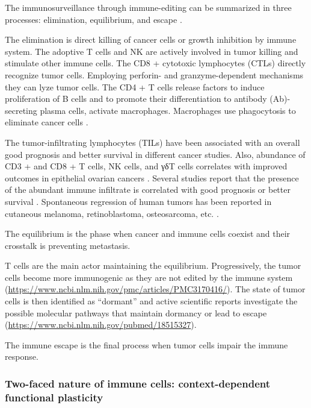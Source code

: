 \documentclass[12pt,]{book}
\theoremstyle{definition}
\theoremstyle{definition}
\theoremstyle{definition}
\theoremstyle{remark}
\begin{document}
The immunosurveillance through immune-editing can be summarized in three
processes: elimination, equilibrium, and escape \citep{Dunn2002}.

The elimination is direct killing of cancer cells or growth inhibition
by immune system. The adoptive T cells and NK are actively involved in
tumor killing and stimulate other immune cells. The CD8 + cytotoxic
lymphocytes (CTLs) directly recognize tumor cells. Employing perforin-
and granzyme-dependent mechanisms they can lyze tumor cells. The CD4 + T
cells release factors to induce proliferation of B cells and to promote
their differentiation to antibody (Ab)-secreting plasma cells, activate
macrophages. Macrophages use phagocytosis to eliminate cancer cells
\citep{Vesely2011}.

The tumor-infiltrating lymphocytes (TILs) have been associated with an
overall good prognosis and better survival in different cancer studies.
Also, abundance of CD3 + and CD8 + T cells, NK cells, and γδT cells
correlates with improved outcomes in epithelial ovarian cancers
\citep{Marquez2012}. Several studies report that the presence of the
abundant immune infiltrate is correlated with good prognosis or better
survival \citep{Kornstein1983, Baxevanis1994, Naito1998, Pages2005}.
Spontaneous regression of human tumors has been reported in cutaneous
melanoma, retinoblastoma, osteosarcoma, etc. \citep{Aris2012}.

The equilibrium is the phase when cancer and immune cells coexist and
their crosstalk is preventing metastasis.

T cells are the main actor maintaining the equilibrium. Progressively,
the tumor cells become more immunogenic as they are not edited by the
immune system
(\url{https://www.ncbi.nlm.nih.gov/pmc/articles/PMC3170416/}). The state
of tumor cells is then identified as ``dormant'' and active scientific
reports investigate the possible molecular pathways that maintain
dormancy or lead to escape
(\url{https://www.ncbi.nlm.nih.gov/pubmed/18515327}).

The immune escape is the final process when tumor cells impair the
immune response.

\hypertarget{two-faced-nature-of-immune-cells-context-dependent-functional-plasticity}{%
\subsubsection{Two-faced nature of immune cells: context-dependent
functional
plasticity}\label{two-faced-nature-of-immune-cells-context-dependent-functional-plasticity}}
\end{document}
